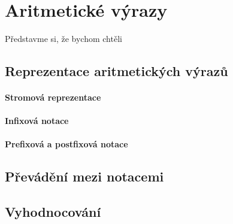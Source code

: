 \ifx\ucebnice\undefined

\setcounter{section}{3}
\fi
\section{Aritmetické výrazy}
Představme si, že bychom chtěli 
\begin{todo}
\subsection{Reprezentace aritmetických výrazů}
\paragraph{Stromová reprezentace}
\paragraph{Infixová notace}
\paragraph{Prefixová a postfixová notace}
\subsection{Převádění mezi notacemi}
\subsection{Vyhodnocování}
\end{todo}
\ifx\ucebnice\undefined

\fi
